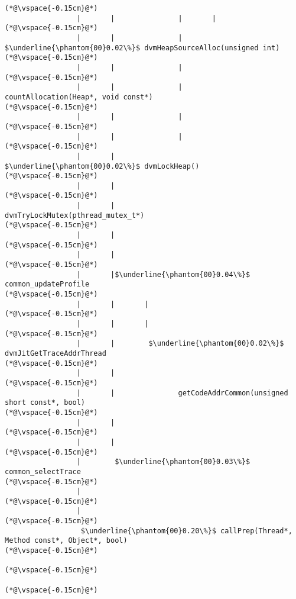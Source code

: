 \begin{lstlisting}
(*@\vspace{-0.15cm}@*)
                 |       |               |       |
(*@\vspace{-0.15cm}@*)
                 |       |               |        $\underline{\phantom{00}0.02\%}$ dvmHeapSourceAlloc(unsigned int)
(*@\vspace{-0.15cm}@*)
                 |       |               |
(*@\vspace{-0.15cm}@*)
                 |       |               |               countAllocation(Heap*, void const*)
(*@\vspace{-0.15cm}@*)
                 |       |               |
(*@\vspace{-0.15cm}@*)
                 |       |               |
(*@\vspace{-0.15cm}@*)
                 |       |                $\underline{\phantom{00}0.02\%}$ dvmLockHeap()
(*@\vspace{-0.15cm}@*)
                 |       |   
(*@\vspace{-0.15cm}@*)
                 |       |                       dvmTryLockMutex(pthread_mutex_t*)
(*@\vspace{-0.15cm}@*)
                 |       |
(*@\vspace{-0.15cm}@*)
                 |       |
(*@\vspace{-0.15cm}@*)
                 |       |$\underline{\phantom{00}0.04\%}$ common_updateProfile
(*@\vspace{-0.15cm}@*)
                 |       |       |
(*@\vspace{-0.15cm}@*)
                 |       |       |
(*@\vspace{-0.15cm}@*)
                 |       |        $\underline{\phantom{00}0.02\%}$ dvmJitGetTraceAddrThread
(*@\vspace{-0.15cm}@*)
                 |       |  
(*@\vspace{-0.15cm}@*)
                 |       |               getCodeAddrCommon(unsigned short const*, bool)
(*@\vspace{-0.15cm}@*)
                 |       |
(*@\vspace{-0.15cm}@*)
                 |       |
(*@\vspace{-0.15cm}@*)
                 |        $\underline{\phantom{00}0.03\%}$ common_selectTrace
(*@\vspace{-0.15cm}@*)
                 |
(*@\vspace{-0.15cm}@*)
                 |
(*@\vspace{-0.15cm}@*)
                  $\underline{\phantom{00}0.20\%}$ callPrep(Thread*, Method const*, Object*, bool)
(*@\vspace{-0.15cm}@*)
          
(*@\vspace{-0.15cm}@*)
          
(*@\vspace{-0.15cm}@*)

\end{lstlisting}

